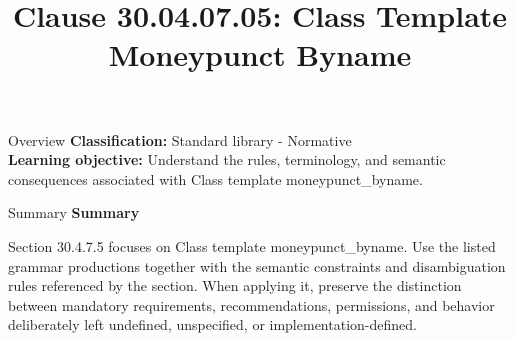 \documentclass[10pt,letterpaper]{article}
\title{Clause 30.04.07.05: Class Template Moneypunct Byname}
\author{}
\date{}
\begin{document}
\maketitle
\begin{CornellOverviewBox}{Overview}
\textbf{Classification:} Standard library - Normative\\[2pt]
\textbf{Learning objective:} Understand the rules, terminology, and semantic consequences associated with Class template moneypunct\_byname.
\end{CornellOverviewBox}\begin{CornellSummaryBox}{Summary}
{\sffamily\bfseries\color{Accent} Summary}\par\vspace{3pt}Section 30.4.7.5 focuses on Class template moneypunct\_byname. Use the listed grammar productions together with the semantic constraints and disambiguation rules referenced by the section. When applying it, preserve the distinction between mandatory requirements, recommendations, permissions, and behavior deliberately left undefined, unspecified, or implementation-defined.
\end{CornellSummaryBox}
\end{document}
